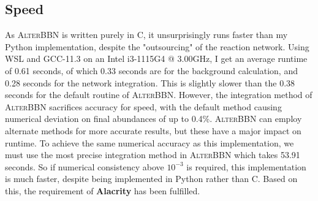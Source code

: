 \subsection{Speed}
As \textsc{AlterBBN} is written purely in C, it unsurprisingly runs faster than my Python implementation, despite the "outsourcing" of the reaction network. Using WSL and GCC-11.3 on an Intel i3-1115G4 @ 3.00GHz, I get an average runtime of 0.61 seconds, of which 0.33 seconds are for the background calculation, and 0.28 seconds for the network integration. This is slightly slower than the 0.38 seconds for the default routine of \textsc{AlterBBN}. However, the integration method of \textsc{AlterBBN} sacrifices accuracy for speed, with the default method causing numerical deviation on final abundances of up to 0.4\%. \textsc{AlterBBN} can employ alternate methods for more accurate results, but these have a major impact on runtime. To achieve the same numerical accuracy as this implementation, we must use the most precise integration method in \textsc{AlterBBN} which takes 53.91 seconds. So if numerical consistency above $10^{-3}$ is required, this implementation is much faster, despite being implemented in Python rather than C.  Based on this, the requirement of \textbf{Alacrity} has been fulfilled.

